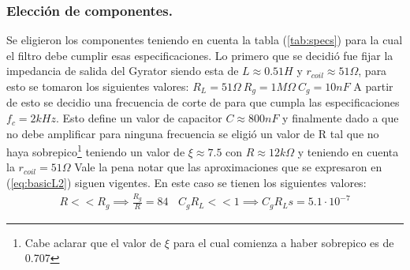 \documentclass[a4paper]{article}
\begin{document}
\subsubsection{Elección de componentes.}
Se eligieron los componentes teniendo en cuenta la tabla (\ref{tab:specs}) para la cual el filtro debe cumplir esas especificaciones.
Lo primero que se decidió fue fijar la impedancia de salida del Gyrator siendo esta de $L \approx 0.51H $ y $r_{coil} \approx 51\Omega $, para esto se tomaron los siguientes valores: $R_L = 51\Omega \ R_g = 1M\Omega \ C_g = 10nF$
A partir de esto se decidio una frecuencia de corte de  para que cumpla las especificaciones $f_c =2kHz $. Esto define un valor de capacitor $C \approx 800nF$ y finalmente dado a que no debe amplificar para ninguna frecuencia se eligió un valor de R tal que no haya sobrepico\footnote{Cabe aclarar que el valor de $\xi$ para el cual comienza a haber sobrepico es de 0.707} teniendo un valor de $\xi \approx 7.5 $ con $R \approx 12k\Omega $ y teniendo en cuenta la $r_{coil} = 51\Omega$  
Vale la pena notar que las aproximaciones que se expresaron en (\ref{eq:basicL2}) siguen vigentes. En este caso se tienen los siguientes valores:
\begin{align}  R<<R_g \implies  \frac{R_g}{R}=  84 \ \ \ \ C_gR_L << 1 \implies C_gR_Ls =5.1\cdot 10^{-7}\end{align}



\end{document}
